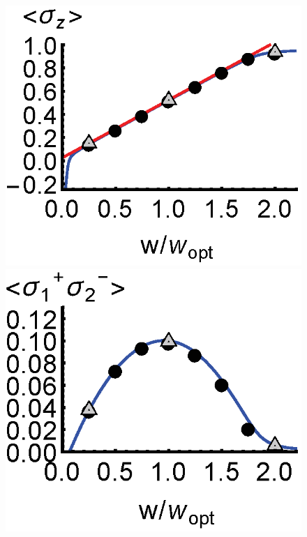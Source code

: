 \documentclass[aps,
twocolumn,
superscriptaddress,groupedaddress]{revtex4}
\begin{document}
\begin{figure}
\begin{center}
	\includegraphics[scale =0.38] {N40LaserSZ.eps}
	\hspace{-5.0mm} \includegraphics[scale =0.38] {N40LaserSPSM.eps}

\end{center}
\end{figure}
\end{document}
